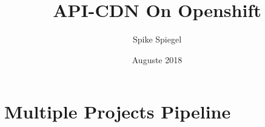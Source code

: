 \documentclass[12pt, letterpaper]{article}
\title{API-CDN On Openshift}
\author{Spike Spiegel}
\date{Auguste 2018}
\begin{document}
\maketitle
\tableofcontents

\section{Multiple Projects Pipeline}



\listoffigures
\end{document}
